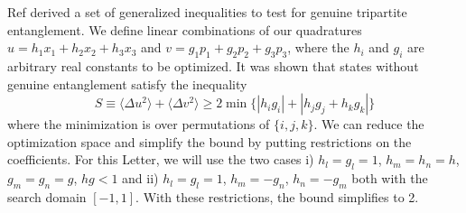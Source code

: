 \documentclass[prl,10pt,twocolumn,superscriptaddress,notitlepage,floatfix,amssymb]{revtex4}
\begin{document}
Ref  \cite{Teh:2014ij} derived a set of generalized inequalities to test for genuine tripartite entanglement. We define linear combinations of our quadratures $u = h_1 x_1 + h_2 x_2 + h_3 x_3$ and $v = g_1 p_1 + g_2 p_2 + g_3 p_3$, where the $h_i$ and $g_i$ are arbitrary real constants to be optimized. It was shown that states without genuine entanglement satisfy the inequality 
\begin{equation}
S \equiv \langle \Delta u^2 \rangle + \langle \Delta v^2 \rangle \ge 2 \min \{| h_i g_i | + | h_j g_j + h_k g_k |  \}
\label{Bound}
\end{equation}
where the minimization is over permutations of $\{i,j,k\}$. We can reduce the optimization space and simplify the bound by putting restrictions on the coefficients. For this Letter, we will use the two cases i) $h_l = g_l = 1$, $h_m = h_n = h$, $g_m = g_n = g$, $h g < 1$ and ii) $h_l = g_l = 1$, $h_m = -g_n$, $h_n = -g_m$ both with the search domain $[-1,1]$. With these restrictions, the bound simplifies to 2.

\end{document}
